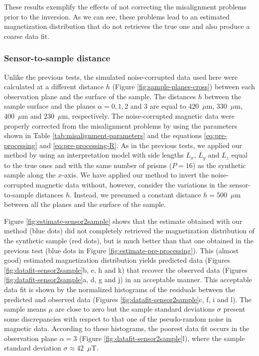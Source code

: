 \documentclass[draft,gc]{agutex}
\begin{document}
\begin{article}
These results exemplify the effects of not correcting the
misalignment problems prior to the inversion.
As we can see, these problems lead to an estimated magnetization 
distribution that do not retrieves the true one and also
produce a coarse data fit.

\subsubsection{Sensor-to-sample distance}

Unlike the previous tests, the simulated noise-corrupted 
data used here were calculated at a different distance $h$ 
(Figure \ref{fig:sample-planes-cross}) between each observation
plane and the surface of the sample.
The distances $h$ between the sample surface and the planes 
$\alpha = 0, 1, 2$ and $3$ are equal to $420$~$\mu$m, $330$~$\mu$m,
$400$~$\mu$m and $230$~$\mu$m, respectively.
The noise-corrupted magnetic data were properly corrected 
from the misalignment problems by using the parameters shown in 
Table \ref{tab:misalignment-parameters} and the equations 
\ref{eq:pre-processing} and \ref{eq:pre-processing-R}.
As in the previous tests, we applied our method by using
an interpretation model with side lengths $L_{x}$, $L_{y}$ 
and $L_{z}$ equal to the true ones and with the same number 
of prisms ($P = 16$) as the synthetic sample along the $x$-axis.
We have applied our method to invert the noise-corrupted magnetic 
data without, however, consider the variations in the 
sensor-to-sample distances $h$. Instead, we presumed a constant
distance $h = 500$~$\mu$m between all the planes and the surface
of the sample.

Figure \ref{fig:estimate-sensor2sample} shows that
the estimate obtained with our method (blue dots) did not
completely retrieved the magnetization distribution of the synthetic
sample (red dots), but is much better than that one obtained in the
previous test (blue dots in Figure \ref{fig:estimate-pre-processing}).
This (almost good) estimated magnetization distribution yields 
predicted data (Figures \ref{fig:datafit-sensor2sample}b, e, h and k) 
that recover the observed data (Figures \ref{fig:datafit-sensor2sample}a, 
d, g and j) in an acceptable manner.
This acceptable data fit is shown by the normalized histograms of 
the residuals between the predicted and
observed data (Figures \ref{fig:datafit-sensor2sample}c, f, i and l).
The sample means $\mu$ are close to zero but the sample standard 
deviations $\sigma$ present some discrepancies with respect to
that one of the pseudo-random noise in magnetic data.
According to these histograms, the poorest data fit occurs in the 
observation plane $\alpha = 3$ (Figure \ref{fig:datafit-sensor2sample}l),
where the sample standard deviation $\sigma \approx 42$~$\mu$T.


\end{article}
\end{document}
